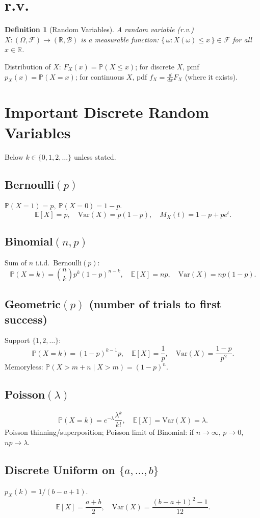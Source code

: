 \documentclass[11pt]{article}
\newtheorem{definition}{Definition}
\newcommand{\Pbb}{\mathbb{P}}
\newcommand{\E}{\mathbb{E}}
\newcommand{\Var}{\mathrm{Var}}
\newcommand{\1}{\mathbf{1}}
\begin{document}
\section{r.v.}
\begin{definition}[Random Variables]
A random variable (r.v.) $X:(\Omega,\mathcal{F})\to(\mathbb{R},\mathcal{B})$ is a measurable function:
$\{\,\omega: X(\omega)\le x\,\}\in\mathcal{F}$ for all $x\in\mathbb{R}$.
\end{definition}
Distribution of $X$: $F_X(x)=\Pbb(X\le x)$; for discrete $X$, pmf $p_X(x)=\Pbb(X=x)$; for continuous $X$, pdf $f_X=\frac{d}{dx}F_X$ (where it exists).


\section{Important Discrete Random Variables}
Below $k\in\{0,1,2,\dots\}$ unless stated.

\subsection*{Bernoulli$(p)$}
$\Pbb(X=1)=p,\ \Pbb(X=0)=1-p$.
\[
  \E[X]=p,\quad \Var(X)=p(1-p),\quad M_X(t)=1-p+pe^t.
\]

\subsection*{Binomial$(n,p)$}
Sum of $n$ i.i.d.\ Bernoulli$(p)$:
\[
  \Pbb(X=k)=\binom{n}{k}p^k(1-p)^{n-k},\quad
  \E[X]=np,\quad \Var(X)=np(1-p).
\]

\subsection*{Geometric$(p)$ (number of trials to first success)}
Support $\{1,2,\dots\}$:
\[
  \Pbb(X=k)=(1-p)^{k-1}p,\quad
  \E[X]=\frac{1}{p},\quad \Var(X)=\frac{1-p}{p^2}.
\]
Memoryless: $\Pbb(X>m+n\mid X>m)=(1-p)^n$.

\subsection*{Poisson$(\lambda)$}
\[
  \Pbb(X=k)=e^{-\lambda}\frac{\lambda^k}{k!},\quad
  \E[X]=\Var(X)=\lambda.
\]
Poisson thinning/superposition; Poisson limit of Binomial: if $n\to\infty$, $p\to 0$, $np\to\lambda$.

\subsection*{Discrete Uniform on $\{a,\dots,b\}$}
$p_X(k)=1/(b-a+1)$.
\[
  \E[X]=\frac{a+b}{2},\quad \Var(X)=\frac{(b-a+1)^2-1}{12}.
\]
\end{document}

